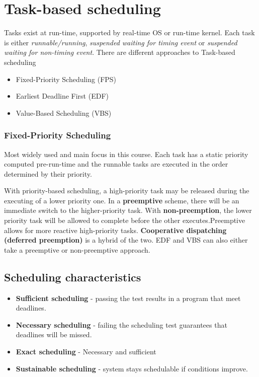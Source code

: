 \section{Task-based scheduling}
Tasks exist at run-time, supported by real-time OS or run-time kernel. Each task is either \textit{runnable/running}, \textit{suspended waiting for timing event} or \textit{suspended waiting for non-timing event}. There are different approaches to Task-based scheduling
\begin{itemize}
\item Fixed-Priority Scheduling (FPS)
\item Earliest Deadline First (EDF)
\item Value-Based Scheduling (VBS)
\end{itemize}

\subsubsection{Fixed-Priority Scheduling}
Most widely used and main focus in this course. Each task has a static priority computed pre-run-time and the runnable tasks are executed in the order determined by their priority.

With priority-based scheduling, a high-priority task may be released during the executing of a lower priority one. In a \textbf{preemptive} scheme, there will be an immediate switch to the higher-priority task. With \textbf{non-preemption}, the lower priority task will be allowed to complete before the other executes.Preemptive allows for more reactive high-priority tasks. \textbf{Cooperative dispatching (deferred preemption)} is a hybrid of the two. EDF and VBS can also either take a preemptive or non-preemptive approach.

\subsection{Scheduling characteristics}
\begin{itemize}
\item \textbf{Sufficient scheduling} - passing the test results in a program that meet deadlines.
\item \textbf{Necessary scheduling} - failing the scheduling test guarantees that deadlines will be missed.
\item \textbf{Exact scheduling} - Necessary and sufficient
\item \textbf{Sustainable scheduling} - system stays schedulable if conditions improve.
\end{itemize}

